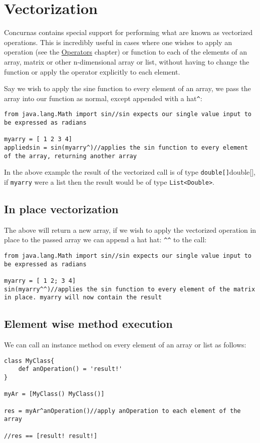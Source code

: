 \documentclass[conc-doc]{subfiles}
\begin{document}
	
	\chapter[Vectorization]{Vectorization}
	
Concurnas contains special support for performing what are known as vectorized operations. This is incredibly useful in cases where one wishes to apply an operation (see the \hyperref[ch:Operators]{Operators} chapter) or function to each of the elements of an array, matrix or other n-dimensional array or list, without having to change the function or apply the operator explicitly to each element.

Say we wish to apply the sine function to every element of an array, we pass the array into our function as normal, except appended with a hat\lstinline{^}:
\begin{lstlisting}
from java.lang.Math import sin//sin expects our single value input to be expressed as radians

myarry = [ 1 2 3 4]
appliedsin = sin(myarry^)//applies the sin function to every element of the array, returning another array
\end{lstlisting}

In the above example the result of the vectorized call is of type \lstinline{double[]}double[], if \lstinline{myarry} were a list then the result would be of type \lstinline{List<Double>}.

\section{In place vectorization}
The above will return a new array, if we wish to apply the vectorized operation in place to the passed array we can append a hat hat: \lstinline{^^} to the call:
\begin{lstlisting}
from java.lang.Math import sin//sin expects our single value input to be expressed as radians

myarry = [ 1 2; 3 4]
sin(myarry^^)//applies the sin function to every element of the matrix in place. myarry will now contain the result
\end{lstlisting}

\section{Element wise method execution}
We can call an instance method on every element of an array or list as follows:
\begin{lstlisting}
class MyClass{
	def anOperation() = 'result!'
}

myAr = [MyClass() MyClass()]

res = myAr^anOperation()//apply anOperation to each element of the array

//res == [result! result!]
\end{lstlisting}
\end{document}
